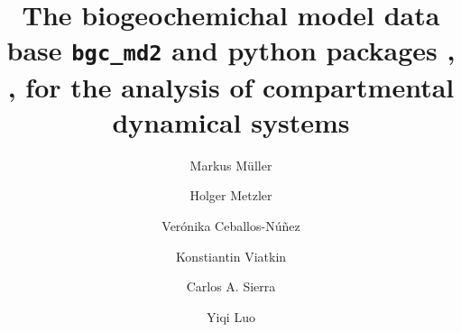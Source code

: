 
%
%

\title{The biogeochemichal model data base \texttt{bgc\_md2} and python
packages  \LAPM, \CompartmentalSystems, \ComputabilityGraphs{} for the analysis of compartmental dynamical systems}
%
%






\author[2]{M{arkus M{\"{u}}ller}}
\author[4]{Holger Metzler}
\author[3]{Ver{\'{o}}nika Ceballos-N{\'{u}}{\~{n}}ez}
\author[2]{Konstiantin Viatkin}
\author[1]{Carlos A. Sierra}
\author[2]{Yiqi Luo}
\affil[3]{}
\affil[4]{}

\begin{abstract} \noindent
  
\end{abstract}

